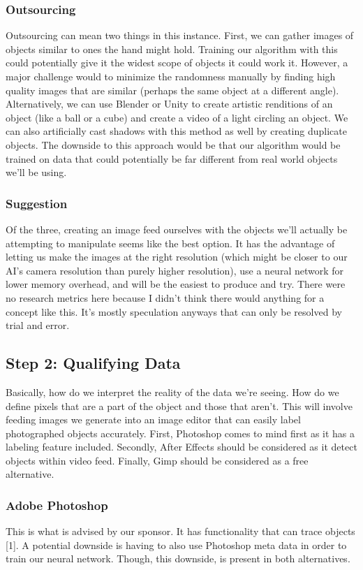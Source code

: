 \documentclass[10pt,journal,compsoc, draftclsnofoot,onecolumn]{IEEEtran}
\begin{document}
\subsubsection{Outsourcing}
Outsourcing can mean two things in this instance.
First, we can gather images of objects similar to ones the hand might hold.
Training our algorithm with this could potentially give it the widest scope of objects it could work it.
However, a major challenge would to minimize the randomness manually by finding high quality images that are similar (perhaps the same object at a different angle).
Alternatively, we can use Blender or Unity to create artistic renditions of an object (like a ball or a cube) and create a video of a light circling an object.
We can also artificially cast shadows with this method as well by creating duplicate objects.
The downside to this approach would be that our algorithm would be trained on data that could potentially be far different from real world objects we'll be using.

\subsubsection{Suggestion}
Of the three, creating an image feed ourselves with the objects we'll actually be attempting to manipulate seems like the best option.
It has the advantage of letting us make the images at the right resolution (which might be closer to our AI's camera resolution than purely higher resolution), use a neural network for lower memory overhead, and will be the easiest to produce and try.
There were no research metrics here because I didn't think there would anything for a concept like this.
It's mostly speculation anyways that can only be resolved by trial and error.


\subsection{Step 2: Qualifying Data}
Basically, how do we interpret the reality of the data we're seeing.
How do we define pixels that are a part of the object and those that aren't.
This will involve feeding images we generate into an image editor that can easily label photographed objects accurately.
First, Photoshop comes to mind first as it has a labeling feature included.
Secondly, After Effects should be considered as it detect objects within video feed.
Finally, Gimp should be considered as a free alternative.

\subsubsection{Adobe Photoshop}
This is what is advised by our sponsor. It has functionality that can trace objects [1].
A potential downside is having to also use Photoshop meta data in order to train our neural network.
Though, this downside, is present in both alternatives.
\end{document}
